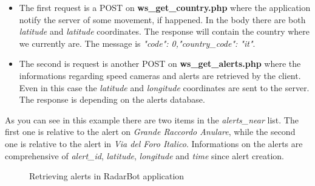 			\begin{itemize}
				\item The first request is a POST on \textbf{ws\_get\_country.php} where the application notify the server of some movement, if happened. In the body there are both \textit{latitude} and \textit{latitude} coordinates. \newline
				The response will contain the country where we currently are. The message is \textit{"code": 0,"country\_code": "it"}. \newline
				\item The second is request is another POST on \textbf{ws\_get\_alerts.php} where the informations regarding speed cameras and alerts are retrieved by the client. Even in this case the \textit{latitude} and \textit{longitude} coordinates are sent to the server. \newline
				The response is depending on the alerts database.\newline
			\end{itemize}
			\par As you can see in this example there are two items in the \textit{alerts\_near} list. The first one is relative to the alert on \textit{Grande Raccordo Anulare}, while the second one is relative to the alert in \textit{Via del Foro Italico}. Informations on the alerts are comprehensive of \textit{alert\_id}, \textit{latitude}, \textit{longitude} and \textit{time} since alert creation.\newline
				\begin{figure}[H]
					\centering
					\caption{Retrieving alerts in RadarBot application}
					\label{radarbot_alert}
				\end{figure}
